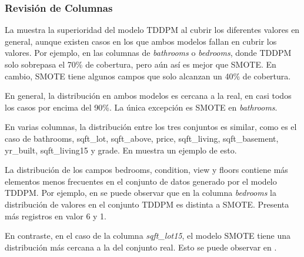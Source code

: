 \newpage
\subsubsection{Revisión de Columnas}
La  muestra la superioridad del modelo TDDPM al cubrir los diferentes valores en general, aunque existen casos en los que ambos modelos fallan en cubrir los valores. Por ejemplo, en las columnas de \emph{bathrooms} o \emph{bedrooms}, donde TDDPM solo sobrepasa el 70\% de cobertura, pero aún así es mejor que SMOTE. En cambio, SMOTE tiene algunos campos que solo alcanzan un 40\% de cobertura.



\newpage
En general, la distribución en ambos modelos es cercana a la real, en casi todos los casos por encima del 90\%. La única excepción es SMOTE en \emph{bathrooms}.



\newpage


En varias columnas, la distribución entre los tres conjuntos es similar, como es el caso de bathrooms, sqft\_lot, sqft\_above, price, sqft\_living, sqft\_basement, yr\_built, sqft\_living15 y grade. En  muestra un ejemplo de esto.




\newpage
La distribución de los campos bedrooms, condition, view y floors contiene más elementos menos frecuentes en el conjunto de datos generado por el modelo TDDPM. Por ejemplo, en  se puede observar que en la columna \emph{bedrooms} la distribución de valores en el conjunto TDDPM es distinta a SMOTE. Presenta más registros en valor 6 y 1.




\newpage
En contraste, en el caso de la columna \emph{sqft\_lot15}, el modelo SMOTE tiene una distribución más cercana a la del conjunto real. Esto se puede observar en .

